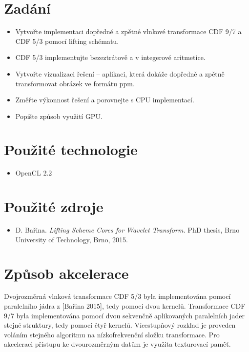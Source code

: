 \documentclass[11pt,a4paper]{article}
\begin{document}
\titlepageandcontents

\section{Zadání}

\begin{itemize}
\item Vytvořte implementaci dopředné a zpětné vlnkové transformace CDF 9/7 a CDF 5/3 pomocí lifting schématu.
\item CDF 5/3 implementujte bezeztrátově a v integerové aritmetice.
\item Vytvořte vizualizaci řešení -- aplikaci, která dokáže dopředně a zpětně transformovat obrázek ve formátu ppm.
\item Změřte výkonnost řešení a porovnejte s CPU implementací.
\item Popište způsob využití GPU.
\end{itemize}

\section{Použité technologie}

\begin{itemize}
\item OpenCL 2.2
\end{itemize}

\section{Použité zdroje}

\begin{itemize}
\item D. Bařina. \textit{Lifting Scheme Cores for Wavelet Transform.} PhD thesis, Brno University of Technology, Brno, 2015.
\end{itemize}

\section{Způsob akcelerace}

Dvojrozměrná vlnková transformace CDF 5/3 byla implementována pomocí paralelního jádra z [Bařina 2015], tedy pomocí dvou kernelů.
Transformace CDF 9/7 byla implementována pomocí dvou sekvenčně aplikovaných paralelních jader stejné struktury, tedy pomocí čtyř kernelů.
Vícestupňový rozklad je proveden voláním stejného algoritmu na nízkofrekvenční složku transformace.
Pro akceleraci přístupu ke dvourozměrným datům je využita texturovací paměť.
\end{document}
